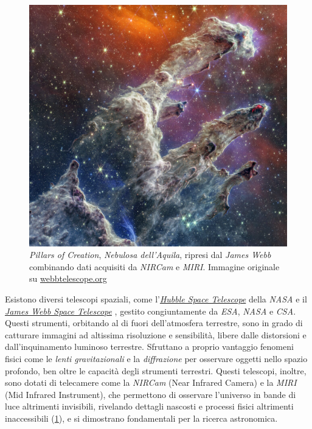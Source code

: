 \begin{figure}[h]
    \centering
    \includegraphics[scale = 0.6]{../assets/Webb_POC.jpg}
    \captionsetup{justification=centering}
    \caption{\textit{Pillars of Creation}, \textit{Nebulosa dell'Aquila}, ripresi dal \textit{James Webb} combinando dati acquisiti da \textit{NIRCam} e \textit{MIRI}. Immagine originale su \href{https://webbtelescope.org/contents/media/images/01GK2KKTR81SGYF24YBGYG7TAP}{webbtelescope.org}} \label{fig:webb_poc}
\end{figure}

Esistono diversi telescopi spaziali, come l'\textit{\href{https://hubblesite.org/home}{Hubble Space Telescope}} \cite{hubble} della \textit{NASA} e il \textit{\href{https://webbtelescope.org/home}{James Webb Space Telescope}} \cite{jwst}, gestito congiuntamente da \textit{ESA}, \textit{NASA} e \textit{CSA}. Questi strumenti, orbitando al di fuori dell'atmosfera terrestre, sono in grado di catturare immagini ad altissima risoluzione e sensibilità, libere dalle distorsioni e dall'inquinamento luminoso terrestre. Sfruttano a proprio vantaggio fenomeni fisici come le \textit{lenti gravitazionali} e la \textit{diffrazione} per osservare oggetti nello spazio profondo, ben oltre le capacità degli strumenti terrestri. Questi telescopi, inoltre, sono dotati di telecamere come la \textit{NIRCam} (Near Infrared Camera) e la \textit{MIRI} (Mid Infrared Instrument), che permettono di osservare l'universo in bande di luce altrimenti invisibili, rivelando dettagli nascosti e processi fisici altrimenti inaccessibili (\cref{fig:webb_poc}), e si dimostrano fondamentali per la ricerca astronomica.


